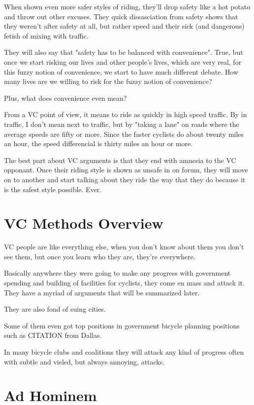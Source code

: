When shown even more safer styles of riding, they'll drop safety like a hot
potato and throw out other excuses. They quick dissasciation from safety shows
that they weren't after safety at all, but rather speed and their sick (and
dangerous) fetish of mixing with traffic.

They will also say that "safety has to be balanced with convenience". True, but
once we start risking our lives and other people's lives, which are very real,
for this fuzzy notion of convenience, we start to have much different debate.
How many lives are we willing to risk for the fuzzy notion of convenience?

Plus, what does convenience even mean?

From a VC point of view, it means to ride as quickly in high speed traffic. By
in traffic, I don't mean next to traffic, but by "taking a lane" on roads where
the average speeds are fifty or more. Since the faster cyclists do about twenty
miles an hour, the speed differencial is thirty miles an hour or more. 

The best part about VC arguments is that they end with amnesia to the VC
opponant. Once their riding style is shown as unsafe in on forum, they will
move on to another and start talking about they ride the way that they do
because it is the safest style possible. Ever. 

\section{VC Methods Overview}

VC people are like everything else, when you don't know about them you don't
see them, but once you learn who they are, they're everywhere. 

Basically anywhere they were going to make any progress with government spending and building of facilities for cyclists, they come en mass and attack it. They have a myriad of arguments that will be summarized later. 

They are also fond of suing cities.

Some of them even got top positions in government bicycle planning positions
such as CITATION from Dallas.

In many bicycle clubs and coalitions they will attack any kind of progress often with subtle and vieled, but always annoying, attacks.

\section{Ad Hominem}

